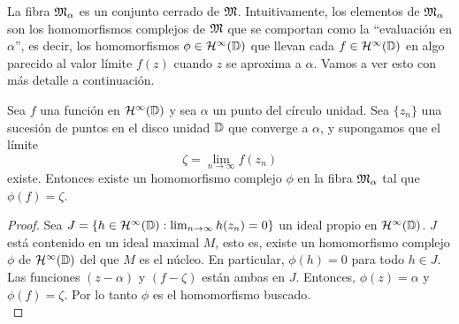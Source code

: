 La fibra $\mathfrak{M}_\alpha$ es un conjunto cerrado de $\mathfrak{M}$. Intuitivamente, los elementos de $\mathfrak{M}_\alpha$ son los homomorfismos complejos de $\mathfrak{M}$ que se comportan como la ``evaluación en $\alpha$'', es decir, los homomorfismos $\phi \in \mathcal{H}^{\infty}(\mathbb{D})$ que llevan cada $f \in \mathcal{H}^{\infty}(\mathbb{D})$ en algo parecido al valor límite $f(z)$ cuando $z$ se aproxima a $\alpha$. Vamos a ver esto con más detalle a continuación. \\

\begin{comment}
Existe una correspondencia uno a uno entre los homomorfismos $\phi: \bholomorphic{\disk} \to \complex$ y los ideales maximales $M$ en el álgebra $\bholomorphic{\disk}$. Esta correspondencia está definida por $M = \ker (\phi)$. Cada ideal maximal $M$ es cerrado, así que cada homomorfismo $\phi$ es continuo:
\begin{equation*}
    \abs{\phi (x)} \leq \norm{x}.
\end{equation*}
\end{comment}



\begin{theorem}
    \label{th:result1}
    Sea $f$ una función en $\mathcal{H}^{\infty}(\mathbb{D})$ y sea $\alpha$ un punto del círculo unidad. Sea $\{z_n\}$ una sucesión de puntos en el disco unidad $\mathbb{D}$ que converge a $\alpha$, y supongamos que el límite
    \begin{equation*}
        \zeta = \lim_{n \to \infty} f(z_n)
    \end{equation*}
    existe. Entonces existe un homomorfismo complejo $\phi$ en la fibra $\mathfrak{M}_\alpha$ tal que $\phi(f) = \zeta$.
\end{theorem}

\begin{proof}
    Sea $J = \{h\in \mathcal{H}^{\infty}(\mathbb{D}) : \lim_{n \to \infty} h(z_n) = 0 \}$ un ideal propio en $\mathcal{H}^{\infty}(\mathbb{D})$. $J$ está contenido en un ideal maximal $M$, esto es, existe un homomorfismo complejo $\phi$ de  $\mathcal{H}^{\infty}(\mathbb{D})$ del que $M$ es el núcleo. En particular, $\phi(h) = 0$ para todo $h \in J$. Las funciones $(z - \alpha)$ y $(f - \zeta)$ están ambas en $J$. Entonces, $\phi(z) = \alpha$ y $\phi(f) = \zeta$. Por lo tanto $\phi$ es el homomorfismo buscado. \\ %
\end{proof}

